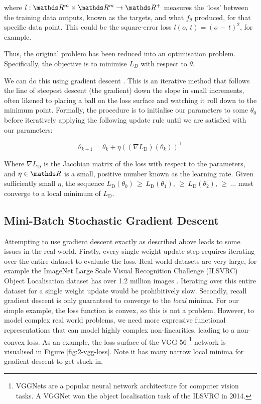 where \(l : \R^m\times\R^m \rightarrow \R^+\) measures the `loss' between the training data outputs, known as the targets, and what \(f_{\theta}\) produced, for that specific data point. This could be the square-error loss \(l(o,\, t) = (o\,-\,t)^2\), for example.

Thus, the original problem has been reduced into an optimisation problem. Specifically, the objective is to minimise \(L_D\) with respect to \(\theta\).

We can do this using gradient descent \cite{Cauchy1847}. This is an iterative method that follows the line of steepest descent (the gradient) down the slope in small increments, often likened to placing a ball on the loss surface and watching it roll down to the minimum point. Formally, the procedure is to initialise our parameters to some \(\theta_0\) before iteratively applying the following update rule until we are satisfied with our parameters:

\begin{equation*}
    \theta_{k+1} = \theta_k + \eta((\nabla L_\mathrm{D})(\theta_k))^\top
\end{equation*}

Where \(\nabla L_\mathrm{D}\) is the Jacobian matrix of the loss with respect to the parameters, and \(\eta \in \R\) is a small, positive number known as the learning rate. Given sufficiently small \(\eta\), the sequence \(L_\mathrm{D}(\theta_0) \,\geq\, L_\mathrm{D}(\theta_1), \,\geq\, L_\mathrm{D}(\theta_2), \,\geq\, \ldots\) must converge to a local minimum of \(L_\mathrm{D}\). 

\subsection{Mini-Batch Stochastic Gradient Descent}
Attempting to use gradient descent exactly as described above leads to some issues in the real-world. Firstly, every single weight update step requires iterating over the entire dataset to evaluate the loss. Real world datasets are very large, for example the ImageNet Large Scale Visual Recognition Challenge (ILSVRC) Object Localisation dataset has over 1.2 million images \cite{ILSVRC15}. Iterating over this entire dataset for a single weight update would be prohibitively slow. Secondly, recall gradient descent is only guaranteed to converge to the \textit{local} minima. For our simple example, the loss function is convex, so this is not a problem. However, to model complex real world problems, we need more expressive functional representations that can model highly complex non-linearities, leading to a non-convex loss. As an example, the loss surface of the VGG-56 \footnote{VGGNets are a popular neural network architecture for computer vision tasks. A VGGNet won the object localisation task of the ILSVRC in 2014.} network \cite{Simonyan2014} is visualised in Figure \ref{fig:2-vgg-loss}. Note it has many narrow local minima for gradient descent to get stuck in.

